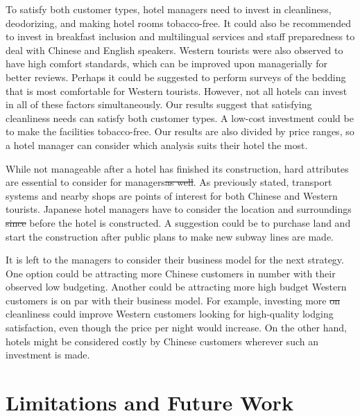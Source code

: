 \documentclass[smallextended,natbib]{svjour3}       %
\providecommand{\DIFadd}[1]{{\protect\color{blue}\uwave{#1}}} %
\providecommand{\DIFdel}[1]{{\protect\color{red}\sout{#1}}}                      %
\providecommand{\DIFaddbegin}{} %
\providecommand{\DIFaddend}{} %
\providecommand{\DIFdelbegin}{} %
\providecommand{\DIFdelend}{} %
\newcommand{\DIFscaledelfig}{0.5}
\newlength{\DIFdelgraphicswidth} %
\newlength{\DIFdelgraphicsheight} %
\newcommand{\DIFaddincludegraphics}[2][]{{\color{blue}\fbox{\DIFOincludegraphics[#1]{#2}}}} %
\newcommand{\DIFdelincludegraphics}[2][]{%
\sbox{\DIFdelgraphicsbox}{\DIFOincludegraphics[#1]{#2}}%
\settoboxwidth{\DIFdelgraphicswidth}{\DIFdelgraphicsbox} %
\settoboxtotalheight{\DIFdelgraphicsheight}{\DIFdelgraphicsbox} %
\scalebox{\DIFscaledelfig}{%
\parbox[b]{\DIFdelgraphicswidth}{\usebox{\DIFdelgraphicsbox}\\[-\baselineskip] \rule{\DIFdelgraphicswidth}{0em}}\llap{\resizebox{\DIFdelgraphicswidth}{\DIFdelgraphicsheight}{%
\setlength{\unitlength}{\DIFdelgraphicswidth}%
\begin{picture}(1,1)%
\thicklines\linethickness{2pt} %
{\color[rgb]{1,0,0}\put(0,0){\framebox(1,1){}}}%
{\color[rgb]{1,0,0}\put(0,0){\line( 1,1){1}}}%
{\color[rgb]{1,0,0}\put(0,1){\line(1,-1){1}}}%
\end{picture}%
}\hspace*{3pt}}} %
} %
\DeclareRobustCommand{\DIFaddbegin}{\DIFOaddbegin \let\includegraphics\DIFaddincludegraphics} %
\DeclareRobustCommand{\DIFaddend}{\DIFOaddend \let\includegraphics\DIFOincludegraphics} %
\DeclareRobustCommand{\DIFdelbegin}{\DIFOdelbegin \let\includegraphics\DIFdelincludegraphics} %
\DeclareRobustCommand{\DIFdelend}{\DIFOaddend \let\includegraphics\DIFOincludegraphics} %
\begin{document}
    To satisfy both customer types, hotel managers need to invest in cleanliness, deodorizing, and making hotel rooms tobacco-free. It could also be recommended to invest in breakfast inclusion and multilingual services and staff preparedness to deal with Chinese and English speakers. Western tourists were also observed to have high comfort standards, which can be improved upon managerially for better reviews. Perhaps it could be suggested to perform surveys of the bedding that is most comfortable for Western tourists. However, not all hotels can invest in all of these factors simultaneously. Our results suggest that satisfying cleanliness needs can satisfy both customer types. A low-cost investment could be to make the facilities tobacco-free. Our results are also divided by price ranges, so a hotel manager can consider which analysis suits their hotel the most.

    While not manageable after a hotel has finished its construction, hard attributes are essential to consider for managers\DIFdelbegin \DIFdel{as well}\DIFdelend . As previously stated, transport systems and nearby shops are points of interest for both Chinese and Western tourists. Japanese hotel managers have to consider the location and surroundings \DIFdelbegin \DIFdel{since }\DIFdelend before the hotel is constructed. A suggestion could be to purchase land and start the construction after public plans to make new subway lines are made. 

    It is left to the managers to consider their business model for the next strategy. One option could be attracting more Chinese customers in number with their observed low budgeting. Another could be attracting more high budget Western customers is on par with their business model. For example, investing more \DIFdelbegin \DIFdel{on }\DIFdelend \DIFaddbegin \DIFadd{in }\DIFaddend cleanliness could improve Western customers looking for high-quality lodging satisfaction, even though the price per night would increase. On the other hand, hotels might be considered costly by Chinese customers wherever such an investment is made.

\section{Limitations and Future Work}\label{limitations}
\end{document}

